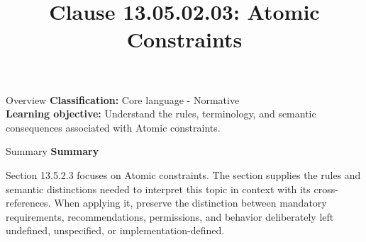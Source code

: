\documentclass[10pt,letterpaper]{article}
\title{Clause 13.05.02.03: Atomic Constraints}
\author{}
\date{}
\begin{document}
\maketitle
\begin{CornellOverviewBox}{Overview}
\textbf{Classification:} Core language - Normative\\[2pt]
\textbf{Learning objective:} Understand the rules, terminology, and semantic consequences associated with Atomic constraints.
\end{CornellOverviewBox}\begin{CornellSummaryBox}{Summary}
{\sffamily\bfseries\color{Accent} Summary}\par\vspace{3pt}Section 13.5.2.3 focuses on Atomic constraints. The section supplies the rules and semantic distinctions needed to interpret this topic in context with its cross-references. When applying it, preserve the distinction between mandatory requirements, recommendations, permissions, and behavior deliberately left undefined, unspecified, or implementation-defined.
\end{CornellSummaryBox}
\end{document}
